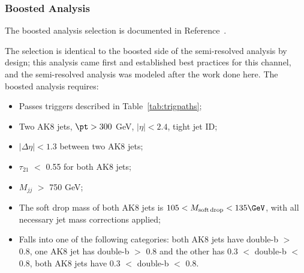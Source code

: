 \subsubsection{Boosted Analysis\label{sss:boost}}

The boosted analysis selection is documented in Reference~\cite{Sirunyan:2017isc}.

The selection is identical to the boosted side of the semi-resolved analysis by design; this analysis came first and established best practices for this channel, and the semi-resolved analysis was modeled after the work done here. The boosted analysis requires:
\begin{itemize}
\item Passes triggers described in Table~\ref{tab:trigpaths};
\item Two AK8 jets, $\pt > 300$ GeV, $|\eta| < 2.4$, tight jet ID;
\item $|\Delta\eta| < 1.3$ between two AK8 jets;
\item $\tau_{21}$ $<$ 0.55 for both AK8 jets;
\item $M_{jj}$ $>$ 750 GeV;
\item The soft drop mass of both AK8 jets is $105 < M_{\rm soft\,drop} < 135\GeV$, with all necessary jet mass corrections applied;
\item Falls into one of the following categories: both AK8 jets have double-b $>$ 0.8, one AK8 jet has double-b $>$ 0.8 and the other has 0.3 $<$ double-b $<$ 0.8, both AK8 jets have 0.3 $<$ double-b $<$ 0.8.
\end{itemize}

